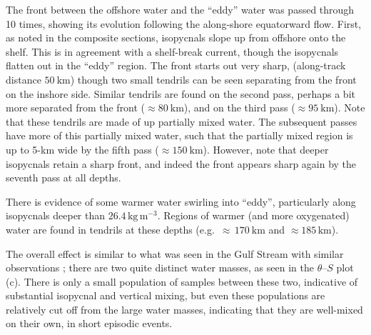 \documentclass[draft]{agujournal2019}
\begin{document}
The front between the offshore water and the ``eddy'' water was passed through 10 times, showing its evolution following the along-shore equatorward flow.  First, as noted in the composite sections, isopycnals slope up from offshore onto the shelf.  This is in agreement with a shelf-break current, though the isopycnals flatten out in the ``eddy'' region.  The front starts out very sharp, (along-track distance $50\ \mathrm{km}$) though two small tendrils can be seen separating from the front on the inshore side.  Similar tendrils are found on the second pass, perhaps a bit more separated from the front ($\approx 80\ \mathrm{km}$), and on the third pass ($\approx 95\ \mathrm{km}$).  Note that these tendrils are made of up partially mixed water.  The subsequent passes have more of this partially mixed water, such that the partially mixed region is up to 5-km wide by the fifth pass ($\approx 150\ \mathrm{km}$).  However, note that deeper isopycnals retain a sharp front, and indeed the front appears sharp again by the seventh pass at all depths.

There is evidence of some warmer water swirling into ``eddy'', particularly along isopycnals deeper than $26.4\,\mathrm{kg\,m^{-3}}$.  Regions of warmer (and more oxygenated) water are found in tendrils at these depths (e.g.\ $\approx\,170\ \mathrm{km}$ and $\approx 185\,\mathrm{km}$).

The overall effect is similar to what was seen in the Gulf Stream with similar observations \cite{klymaketal16}; there are two quite distinct water masses, as seen in the $\theta$--$S$ plot (c). There is only a small population of samples between these two, indicative of substantial isopycnal and vertical mixing, but even these populations are relatively cut off from the large water masses, indicating that they are well-mixed on their own, in short episodic events.
\end{document}
